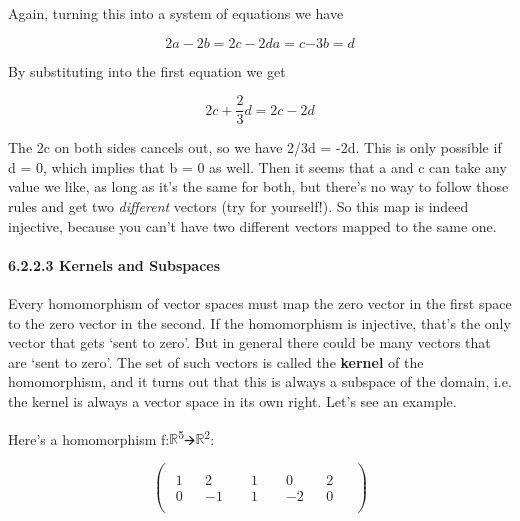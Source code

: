 \documentclass[oneside,english]{amsbook}
\numberwithin{section}{chapter}
\theoremstyle{plain}
\theoremstyle{definition}
\begin{document}
Again, turning this into a system of equations we have

\[{2a - 2b = 2c - 2d
}{a = c
}{- 3b = d}\]

By substituting into the first equation we get

\[2c + \frac{2}{3}d = 2c - 2d\]

The 2c on both sides cancels out, so we have 2/3d = -2d. This is only
possible if d = 0, which implies that b = 0 as well. Then it seems that
a and c can take any value we like, as long as it's the same for both,
but there's no way to follow those rules and get two \emph{different}
vectors (try for yourself!). So this map is indeed injective, because
you can't have two different vectors mapped to the same one.

\paragraph{6.2.2.3 Kernels and Subspaces}\label{kernels-and-subspaces}

Every homomorphism of vector spaces must map the zero vector in the
first space to the zero vector in the second. If the homomorphism is
injective, that's the only vector that gets `sent to zero'. But in
general there could be many vectors that are `sent to zero'. The set
of such vectors is called the \textbf{kernel} of the homomorphism, and
it turns out that this is always a subspace of the domain, i.e. the
kernel is always a vector space in its own right. Let's see an example.

Here's a homomorphism
f:$\mathbb{R}$\textsuperscript{5}🡪$\mathbb{R}$\textsuperscript{2}:

\[\begin{pmatrix}
	\begin{matrix}
		1 \\
		0
	\end{matrix} & \begin{matrix}
		2 \\
		- 1
	\end{matrix} & \begin{matrix}
		\begin{matrix}
			1 \\
			1
		\end{matrix} & \begin{matrix}
			\begin{matrix}
				0 \\
				- 2
			\end{matrix} & \begin{matrix}
				2 \\
				0
			\end{matrix}
		\end{matrix}
	\end{matrix}
\end{pmatrix}\]
\end{document}
